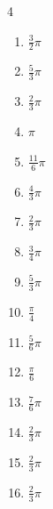 \begin{multicols}{4}
\begin{enumerate}
  \item $\displaystyle \frac{3}{2}\pi$

  \item $\displaystyle \frac{5}{3}\pi$

  \item $\displaystyle \frac{2}{3}\pi$

  \item $\displaystyle \pi$

  \item $\displaystyle \frac{11}{6}\pi$

  \item $\displaystyle \frac{4}{3}\pi$

  \item $\displaystyle \frac{2}{3}\pi$

  \item $\displaystyle \frac{3}{4}\pi$

  \item $\displaystyle \frac{5}{3}\pi$

  \item $\displaystyle \frac{\pi}{4}$

  \item $\displaystyle \frac{5}{6}\pi$

  \item $\displaystyle \frac{\pi}{6}$

  \item $\displaystyle \frac{7}{6}\pi$

  \item $\displaystyle \frac{2}{3}\pi$

  \item $\displaystyle \frac{2}{3}\pi$

  \item $\displaystyle \frac{2}{3}\pi$


\end{enumerate}
\end{multicols}

